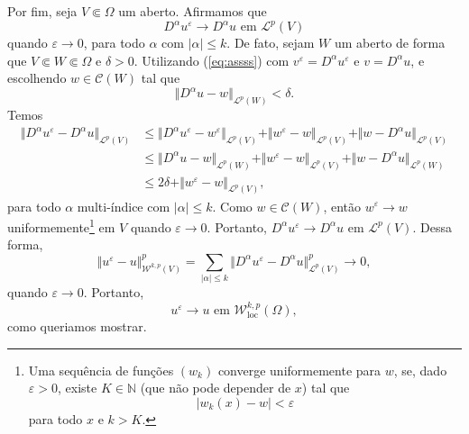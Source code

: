 \documentclass[a4paper, 11pt]{book}
\theoremstyle{definition}
\newcommand{\bN}{\mathbb{N}}
\newcommand{\cC}{\mathcal{C}}
\newcommand{\cL}{\mathcal{L}}
\newcommand{\cW}{\mathcal{W}}
\newcommand{\loc}{\mathrm{loc}}
\begin{document}
\begin{prf}
    Por fim, seja $V \Subset \Omega$ um aberto. Afirmamos que
    \begin{equation}
        D ^\alpha u^\varepsilon \to D^\alpha u \text{ em } \cL^p(V)
    \end{equation}
    quando $\varepsilon \to 0$, para todo $\alpha$ com $|\alpha| \leqslant k$.
    De fato, sejam $W$ um aberto de forma que $V \Subset W \Subset \Omega$ e $\delta > 0$. Utilizando (\ref{eq:assss}) com $v ^\varepsilon = D^\alpha u^\varepsilon$ e $v = D^\alpha u$, e escolhendo $w \in \cC(W)$ tal que
    \[
        \Vert D^\alpha u - w \Vert_{\cL^p(W)} < \delta.
    \]
    Temos
    \[
        \begin{aligned}
            \Vert D^\alpha u^\varepsilon - D^\alpha u \Vert_{\cL^p(V)} 
            &\leqslant \Vert D^\alpha u^\varepsilon - w^\varepsilon \Vert_{\cL^p(V)} + \Vert w^\varepsilon - w \Vert_{\cL^p(V)} + \Vert w - D^\alpha u \Vert_{\cL^p(V)}\\
            &\leqslant \Vert D^\alpha u - w \Vert_{\cL^p(W)} + \Vert w^\varepsilon - w \Vert_{\cL^p(V)} + \Vert w - D^\alpha u \Vert_{\cL^p(W)}\\ 
            &\leqslant 2\delta + \Vert w^\varepsilon - w \Vert_{\cL^p(V)},
        \end{aligned}
    \]
    para todo $\alpha$ multi-índice com $|\alpha| \leqslant k$.
    Como $w \in \cC(W)$, então $w^\varepsilon \to w$ uniformemente\footnote{Uma sequência de funções $(w_k)$ converge uniformemente para $w$, se, dado $\varepsilon > 0$, existe $K \in \bN$ (que não pode depender de $x$) tal que
    \[
        | w_k(x) - w | < \varepsilon
    \]
    para todo $x$ e $k > K$.
    } em $V$ quando $\varepsilon \to 0$. 
    Portanto, $D^\alpha u^\varepsilon \to D^\alpha u$ em $\cL^p(V)$.
    Dessa forma,
    \[
        \Vert u^\varepsilon - u \Vert^p_{\cW^{k,p}(V)} = \sum_{|\alpha| \leqslant k} \Vert D^\alpha u^\varepsilon - D^\alpha u \Vert^p_{\cL^p(V)} \to 0,
    \]
    quando $\varepsilon \to 0$. Portanto,
    \[
        u^\varepsilon \to u \text{ em } \cW^{k,p}_\loc(\Omega),
    \]
    como queriamos mostrar.
\end{prf}
\end{document}
